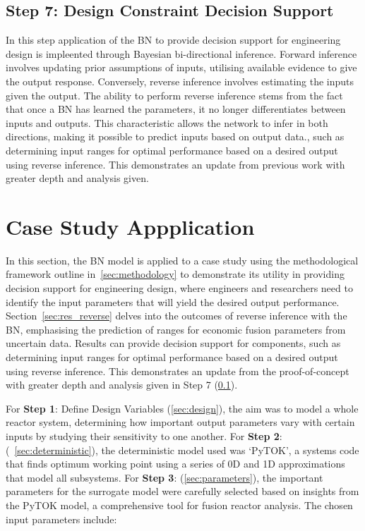 \documentclass[journal]{IEEEtran}
\begin{document}
\subsection{\textbf{Step 7}: Design Constraint Decision Support}\label{sec:meth_decision}

In this step application of the BN to provide decision support for engineering design is impleented through Bayesian bi-directional inference. Forward inference involves updating prior assumptions of inputs, utilising available evidence to give the output response. Conversely, reverse inference involves estimating the inputs given the output. The ability to perform reverse inference stems from the fact that once a BN has learned the parameters, it no longer differentiates between inputs and outputs. This characteristic allows the network to infer in both directions, making it possible to predict inputs based on output data., such as determining input ranges for optimal performance based on a desired output using reverse inference. This demonstrates an update from previous work with greater depth and analysis given. 

\section{Case Study Appplication}\label{sec:res_decision} 

In this section, the BN model is applied to a case study using the methodological framework outline in~\ref{sec:methodology} to demonstrate its utility in providing decision support for engineering design, where engineers and researchers need to identify the input parameters that will yield the desired output performance. Section~\ref{sec:res_reverse} delves into the outcomes of reverse inference with the BN, emphasising the prediction of ranges for economic fusion parameters from uncertain data. Results can provide decision support for components, such as determining input ranges for optimal performance based on a desired output using reverse inference. This demonstrates an update from the proof-of-concept with greater depth and analysis given in Step 7 (\ref{sec:meth_decision}).

For \textbf{Step 1}: Define Design Variables (\ref{sec:design}), the aim was to model a whole reactor system, determining how important output parameters vary with certain inputs by studying their sensitivity to one another. For \textbf{Step 2}: (~\ref{sec:deterministic}), the deterministic  model used was `PyTOK', a systems code that finds optimum working point using a series of 0D and 1D approximations that model all subsystems. For \textbf{Step 3}: (\ref{sec:parameters}), the important parameters for the surrogate model were carefully selected based on insights from the PyTOK model, a comprehensive tool for fusion reactor analysis. The chosen input parameters include: 
\end{document}
